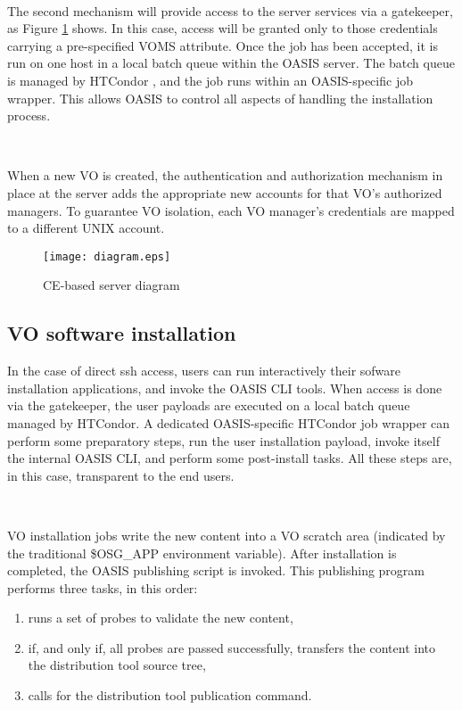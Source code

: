 \documentclass[a4paper]{jpconf}
\begin{document}
~

The second mechanism will provide access to the server services via a
gatekeeper, as Figure \ref{ceserver} shows.
In this case, access will be granted only to those credentials carrying a
pre-specified VOMS \cite{voms} attribute.
Once the job has been accepted, it is run on one host in a local batch queue within the OASIS server. 
The batch queue is managed by HTCondor \cite{condor}, and the job runs within an
OASIS-specific job wrapper. This allows OASIS to control all aspects of handling
the installation process. 

~

When a new VO is created, the authentication and authorization mechanism 
in place at the server adds the appropriate new accounts for that VO's authorized managers. 
To guarantee VO isolation, each VO manager's credentials are mapped to a different UNIX account.

\begin{figure}[b]
\centering\texttt{[image: diagram.eps]}
%
%
\caption{CE-based server diagram}
\label{ceserver}
\end{figure}

\subsection{VO software installation}

In the case of direct ssh access, users can run interactively their sofware installation applications, 
and invoke the OASIS CLI tools.
When access is done via the gatekeeper, the user payloads are executed on a local batch queue managed by HTCondor.
A dedicated OASIS-specific HTCondor job wrapper can perform some preparatory
steps, run the user installation payload,
invoke itself the internal OASIS CLI,
and perform some post-install tasks. 
All these steps are, in this case, transparent to the end users.

~

VO installation jobs write the new content into a VO scratch area (indicated by
the traditional \$OSG\_APP environment variable).
After installation is completed, the OASIS publishing script is invoked. 
This publishing program performs three tasks, in this order:

\begin{enumerate}
    \item runs a set of probes to validate the new content,
    \item if, and only if, all probes are passed successfully,
          transfers the content into the distribution tool source tree,
    \item calls for the distribution tool publication command.
\end{enumerate}
\end{document}
